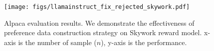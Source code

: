 \begin{figure}[t]
\centering
\texttt{[image: figs/llamainstruct\_fix\_rejected\_skywork.pdf]}
\caption{Alpaca evaluation results. We demonstrate the effectiveness of preference data construction strategy on Skywork reward model. x-axis is the number of sample ($n$), y-axis is the performance.}
\label{llama_skywork}
\vspace{-1em}
\end{figure}
